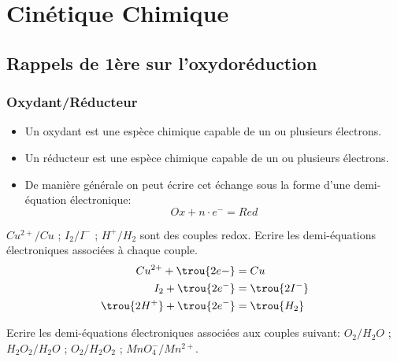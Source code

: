 \setcounter{chapter}{11}
\chapter{Cinétique Chimique}

\section{Rappels de 1ère sur l'oxydoréduction}
\subsection{Oxydant/Réducteur}
\begin{itemize}
	\item Un oxydant est une espèce chimique capable de  un ou plusieurs électrons.
	\item Un réducteur est une espèce chimique capable de  un ou plusieurs électrons.
	\item De manière générale on peut écrire cet échange sous la forme d'une demi-équation électronique: $$\boxed{Ox + n\cdot e^- = Red}$$
\end{itemize}
 $Cu^{2+}/Cu$ ; $I_2/I^-$ ; $H^+/H_2$ sont des couples redox. Ecrire les demi-équations électroniques associées à chaque couple.
\begin{align*}
	Cu^{2+} + \trou{2e-} &= Cu\\
I_2 + \trou{2e^-} &= \trou{2I^-}\\
\trou{2H^+} +\trou{ 2e^-} &= \trou{H_2}
\end{align*}


 Ecrire les demi-équations électroniques associées aux couples suivant: $O_2/H_2O$ ; $H_2O_2/H_2O$ ; $O_2/H_2O_2$ ; $MnO_4^-/Mn^{2+}$.
\newpage

